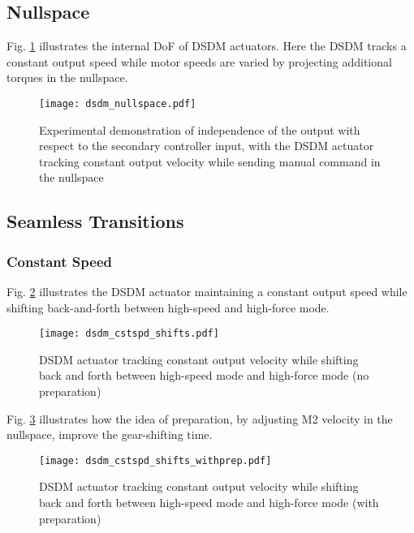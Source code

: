 \subsection{Nullspace}

Fig. \ref{fig:dsdm_nullspace} illustrates the internal DoF of DSDM actuators. Here the DSDM tracks a constant output speed while motor speeds are varied by projecting additional torques in the nullspace.
%
\begin{figure}[H]
	\centering
		\texttt{[image: dsdm\_nullspace.pdf]}
	\caption[DSDM actuator tracking constant output velocity: nullspace]{Experimental demonstration of independence of the output with respect to the secondary controller input, with the DSDM actuator tracking constant output velocity while sending manual command in the nullspace }
	\label{fig:dsdm_nullspace}
\end{figure}


\subsection{Seamless Transitions}

\subsubsection{Constant Speed}

Fig. \ref{fig:dsdm_cstspd_shifts} illustrates the DSDM actuator maintaining a constant output speed while shifting back-and-forth between high-speed and high-force mode.
%
\begin{figure}[htp]
	\centering
		\texttt{[image: dsdm\_cstspd\_shifts.pdf]}
	\caption[DSDM actuator tracking constant output velocity: shifts]{DSDM actuator tracking constant output velocity while shifting back and forth between high-speed mode and high-force mode (no preparation) }
	\label{fig:dsdm_cstspd_shifts}
\end{figure}
%
Fig. \ref{fig:dsdm_cstspd_shifts_withprep} illustrates how the idea of preparation, by adjusting M2 velocity in the nullspace, improve the gear-shifting time. 
%
\begin{figure}[htp]
	\centering
		\texttt{[image: dsdm\_cstspd\_shifts\_withprep.pdf]}
	\caption[DSDM actuator tracking constant output velocity: preparation]{DSDM actuator tracking constant output velocity while shifting back and forth between high-speed mode and high-force mode (with preparation) }
	\label{fig:dsdm_cstspd_shifts_withprep}
\end{figure}

